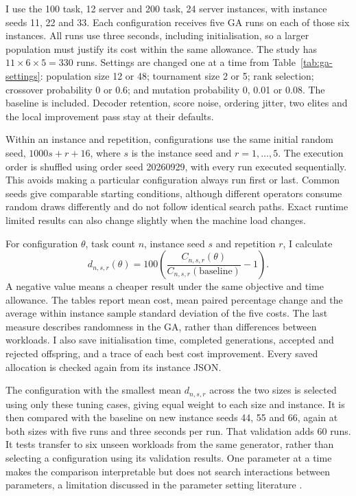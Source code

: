 \documentclass[10pt,a4paper]{article}
\begin{document}
I use the 100 task, 12 server and 200 task, 24 server instances, with instance
seeds 11, 22 and 33. Each configuration receives five GA runs on each of those
six instances. All runs use three seconds, including initialisation, so a larger
population must justify its cost within the same allowance. The study has
$11\times6\times5=330$ runs. Settings are changed one at a time from
Table~\ref{tab:ga-settings}: population size 12 or 48; tournament size 2 or 5;
rank selection; crossover probability 0 or 0.6; and mutation probability 0,
0.01 or 0.08. The baseline is included. Decoder retention, score noise, ordering
jitter, two elites and the local improvement pass stay at their defaults.

Within an instance and repetition, configurations use the same initial random
seed, $1000s+r+16$, where $s$ is the instance seed and $r=1,\ldots,5$.
The execution order is shuffled using order seed 20260929, with every run
executed sequentially. This avoids making a particular configuration always
run first or last. Common seeds give comparable starting conditions, although
different operators consume random draws differently and do not follow
identical search paths. Exact runtime limited results can also change slightly
when the machine load changes.

For configuration $\theta$, task count $n$, instance seed $s$ and repetition
$r$, I calculate
\[
d_{n,s,r}(\theta)=100\left(\frac{C_{n,s,r}(\theta)}{C_{n,s,r}(\mathrm{baseline})}-1\right).
\]
A negative value means a cheaper result under the same objective and time
allowance. The tables report mean cost, mean paired percentage change and
the average within instance sample standard deviation of the five costs.
The last measure describes randomness in the GA, rather than differences
between workloads. I also save initialisation time, completed generations,
accepted and rejected offspring, and a trace of each best cost improvement.
Every saved allocation is checked again from its instance JSON.

The configuration with the smallest mean $d_{n,s,r}$ across the two sizes is
selected using only these tuning cases, giving equal weight to each size and
instance. It is then compared with the baseline on new instance seeds
44, 55 and 66, again at both sizes with five runs and three seconds per run.
That validation adds 60 runs. It tests transfer to six unseen workloads from
the same generator, rather than selecting a configuration using its validation
results. One parameter at a time makes the comparison interpretable but does
not search interactions between parameters, a limitation discussed in the
parameter setting literature \cite{eiben1999}.
\end{document}
